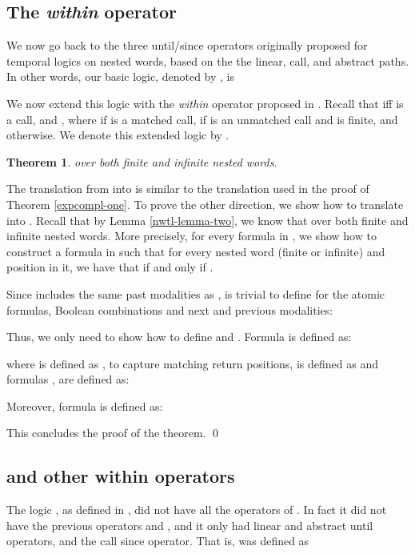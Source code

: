 \documentclass{LMCS}
\theoremstyle{plain}
\newtheorem{theorem}{Theorem}[section]
\theoremstyle{definition}
\begin{document}
\subsection{The {\em within} operator}
\label{sec-within}
We now go back to the three until/since operators originally proposed
for temporal logics on nested words, based on the the linear, call,
and abstract paths. In other words, our basic logic, denoted by 
, is 


We now extend this logic with the {\em within}  operator proposed
in \cite{AEM04}. Recall that  iff  is a call,
and , where  if  is a matched call,
 if  is an unmatched call and  is finite, and  otherwise.
  We denote this extended logic by .

\begin{theorem}
\label{within-thm}
 over both finite and infinite nested words.
\end{theorem}

\proof
The translation from  into  is similar to the
translation used in the proof of Theorem \ref{expcompl-one}. To prove
the other direction, we show how to translate  into
. Recall that by Lemma \ref{nwtl-lemma-two}, we know that
 over both finite and infinite nested words.  More
precisely, for every formula  in , we show how to
construct a formula  in  such that for
every nested word  (finite or infinite) and position  in it, we
have that  if and only if .

Since  includes the same past modalities as ,
 is trivial to define for the atomic formulas, Boolean
combinations and next and previous modalities:

Thus, we only need to show how to define  and
. Formula  is defined as: 

where  is defined as , to capture
matching return positions,  is defined as  and formulas ,  are defined as:

Moreover, formula  is defined as: 

This concludes the proof of the theorem. \qed

\subsection{\texorpdfstring{}{CaRet} and other within operators}

\newcommand{\first}{{\tt first}}

The logic , as defined in \cite{AEM04}, did not have all the
operators of . In fact it did not have the previous operators
 and , and it only had linear and abstract until
operators, and the call since operator.
That is,  was defined as 
\end{document}
